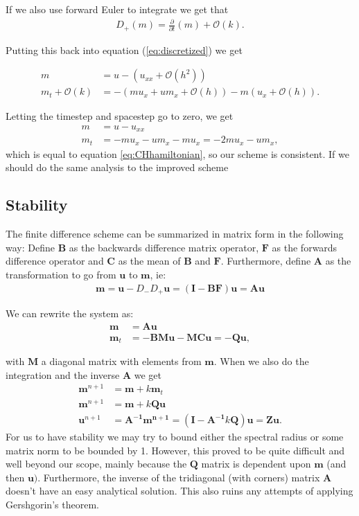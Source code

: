 If we also use forward Euler to integrate we get that
\begin{align*}
D_+ (m) =  \frac{\partial}{\partial t} (m) + \mathcal{O}(k).
\end{align*}

Putting this back into equation (\ref{eq:discretized}) we get

\begin{align*}
m &= u - \left( u_{xx} + \mathcal{O}\left(h^2\right) \right) \\
m_t  + \mathcal{O}(k) &= - \left( m u_x + u m_x + \mathcal{O}(h) \right) - m \left( u_x + \mathcal{O}(h) \right).
\end{align*}

Letting the timestep and spacestep go to zero, we get
\begin{align*}
m &= u - u_{xx} \\
m_t &= - m u_x - u m_x - m u_x = - 2m u_x - u m_x,
\end{align*}
which is equal to equation \ref{eq:CHhamiltonian}, so our scheme is consistent. If we should do the same analysis to the improved scheme 

\subsection*{Stability}
The finite difference scheme can be summarized in matrix form in the following way:
Define $\bm{B}$ as the backwards difference matrix operator, $\bm{F}$ as the forwards difference operator and $\bm{C}$ as the mean of $\bm{B}$ and $\bm{F}$. Furthermore, define $\bm{A}$ as the transformation to go from $\bm{u}$ to $\bm{m}$, ie:
\begin{align*}
\bm{m} = \bm{u}-D_-D_+\bm{u} = (\bm{I}-\bm{BF})\bm{u} = \bm{A} \bm{u}
\end{align*} 


We can rewrite the system as:
\begin{align*}
\bm{m} &= \bm{Au} \\
\bm{m}_t &= -\bm{BMu} - \bm{MCu} = \bm{-Qu},
\end{align*}

with $\bm{M}$ a diagonal matrix with elements from $\bm{m}$. When we also do the integration and the inverse $\bm{A}$ we get
\begin{align*}
\bm{m}^{n+1} &= \bm{m} + k\bm{m}_t \\
\bm{m}^{n+1} &= \bm{m} + k\bm{Qu} \\
\bm{u}^{n+1} &= \bm{A^{-1}m^{n+1}} = \left(\bm{I} -\bm{A^{-1}}k\bm{Q}\right)\bm{u} = \bm{Zu}.
\end{align*}
For us to have stability we may try to bound either the spectral radius or some matrix norm to be bounded by 1. However, this proved to be quite difficult and well beyond our scope, mainly because the $\bm{Q}$ matrix is dependent upon $\bm{m}$ (and then $\bm{u})$. Furthermore, the inverse of the tridiagonal (with corners) matrix $\bm{A}$ doesn't have an easy analytical solution. This also ruins any attempts of applying Gershgorin's theorem.

